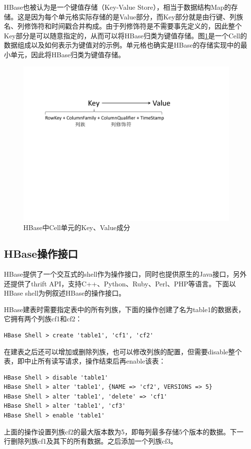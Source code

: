 HBase也被认为是一个键值存储（Key-Value Store），相当于数据结构Map的存储。这是因为每个单元格实际存储的是Value部分，而Key部分就是由行键、列族名、列修饰符和时间戳合并构成。由于列修饰符是不需要事先定义的，因此整个Key部分是可以随意指定的，从而可以将HBase归类为键值存储。图\ref{fig:hbase_cell}是一个Cell的数据组成以及如何表示为键值对的示例。单元格也确实是HBase的存储实现中的最小单元，因此将HBase归类为键值存储。

\begin{figure}[htbp]
\centering
\includegraphics[width=120mm]{fig/HBase_key_value.pdf}
\caption{HBase中Cell单元的Key、Value成分}
\label{fig:hbase_cell}
\end{figure}

\subsection{HBase操作接口}
HBase提供了一个交互式的shell作为操作接口，同时也提供原生的Java接口，另外还提供了thrift API，支持C++、Python、Ruby、Perl、PHP等语言。下面以HBase shell为例叙述HBase的操作接口。

HBase建表时需要指定表中的所有列族，下面的操作创建了名为table1的数据表，它拥有两个列族cf1和cf2：
\begin{lstlisting}
HBase Shell > create 'table1', 'cf1', 'cf2'
\end{lstlisting}

在建表之后还可以增加或删除列族，也可以修改列族的配置，但需要disable整个表，即中止所有读写请求，操作结束后再enable该表：
\begin{lstlisting}
HBase Shell > disable 'table1'
HBase Shell > alter 'table1', {NAME => 'cf2', VERSIONS => 5}
HBase Shell > alter 'table1', 'delete' => 'cf1'
HBase Shell > alter 'table1', 'cf3'
HBase Shell > enable 'table1'
\end{lstlisting}
上面的操作设置列族cf2的最大版本数为5，即每列最多存储5个版本的数据。下一行删除列族cf1及其下的所有数据。之后添加一个列族cf3。

